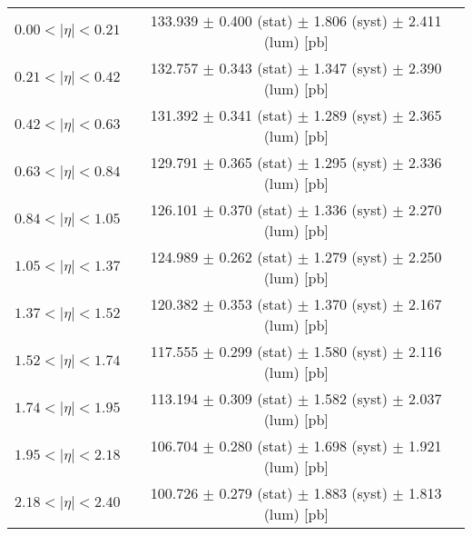 \begin{tabular}{lc}
\hline
$0.00 < |\eta| <0.21$          & 133.939 $\pm$ 0.400 (stat) $\pm$ 1.806 (syst) $\pm$ 2.411 (lum) [pb]  \\
$0.21 < |\eta| <0.42$          & 132.757 $\pm$ 0.343 (stat) $\pm$ 1.347 (syst) $\pm$ 2.390 (lum) [pb]  \\
$0.42 < |\eta| <0.63$          & 131.392 $\pm$ 0.341 (stat) $\pm$ 1.289 (syst) $\pm$ 2.365 (lum) [pb]  \\
$0.63 < |\eta| <0.84$          & 129.791 $\pm$ 0.365 (stat) $\pm$ 1.295 (syst) $\pm$ 2.336 (lum) [pb]  \\
$0.84 < |\eta| <1.05$          & 126.101 $\pm$ 0.370 (stat) $\pm$ 1.336 (syst) $\pm$ 2.270 (lum) [pb]  \\
$1.05 < |\eta| <1.37$          & 124.989 $\pm$ 0.262 (stat) $\pm$ 1.279 (syst) $\pm$ 2.250 (lum) [pb]  \\
$1.37 < |\eta| <1.52$          & 120.382 $\pm$ 0.353 (stat) $\pm$ 1.370 (syst) $\pm$ 2.167 (lum) [pb]  \\
$1.52 < |\eta| <1.74$          & 117.555 $\pm$ 0.299 (stat) $\pm$ 1.580 (syst) $\pm$ 2.116 (lum) [pb]  \\
$1.74 < |\eta| <1.95$          & 113.194 $\pm$ 0.309 (stat) $\pm$ 1.582 (syst) $\pm$ 2.037 (lum) [pb]  \\
$1.95 < |\eta| <2.18$          & 106.704 $\pm$ 0.280 (stat) $\pm$ 1.698 (syst) $\pm$ 1.921 (lum) [pb]  \\
$2.18 < |\eta| <2.40$          & 100.726 $\pm$ 0.279 (stat) $\pm$ 1.883 (syst) $\pm$ 1.813 (lum) [pb]  \\
\hline
\end{tabular}
